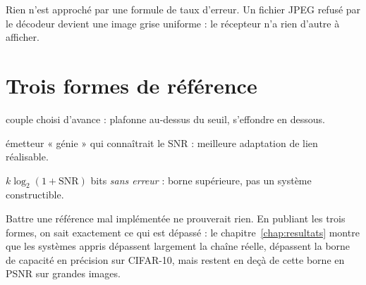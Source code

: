 Rien n'est approché par une formule de taux d'erreur. Un fichier JPEG refusé par le décodeur devient une image
grise uniforme : le récepteur n'a rien d'autre à afficher.

\section{Trois formes de référence}
\label{sec:bornes}

\begin{description}[leftmargin=1.4cm, style=nextline]
  \item[MCS fixe] couple choisi d'avance : plafonne au-dessus du seuil, s'effondre en dessous.
  \item[Meilleur MCS] émetteur « génie » qui connaîtrait le SNR : meilleure adaptation de lien réalisable.
  \item[Borne de capacité] $k\log_2(1+\mathrm{SNR})$ bits \emph{sans erreur} : borne supérieure, pas un
        système constructible.
\end{description}

\begin{keybox}
Battre une référence mal implémentée ne prouverait rien. En publiant les trois formes, on sait exactement ce
qui est dépassé : le chapitre~\ref{chap:resultats} montre que les systèmes appris dépassent largement la
chaîne réelle, dépassent la borne de capacité en précision sur CIFAR-10, mais restent en deçà de cette borne
en PSNR sur grandes images.
\end{keybox}
